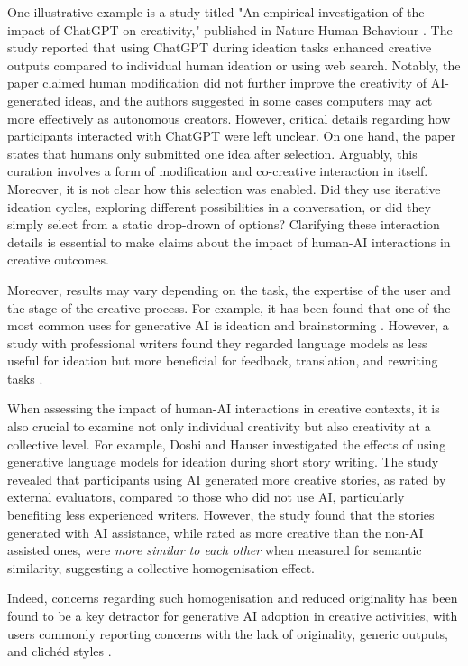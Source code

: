 One illustrative example is a study titled "An empirical investigation of the impact of ChatGPT on creativity," published in Nature Human Behaviour \cite{Lee2024-vz}. The study reported that using ChatGPT during ideation tasks enhanced creative outputs compared to individual human ideation or using web search. Notably, the paper claimed human modification did not further improve the creativity of AI-generated ideas, and the authors suggested in some cases computers may act more effectively as autonomous creators. However, critical details regarding how participants interacted with ChatGPT were left unclear. On one hand, the paper states that humans only submitted one idea after selection. Arguably, this curation involves a form of modification and co-creative interaction in itself. Moreover, it is not clear how this selection was enabled. Did they use iterative ideation cycles, exploring different possibilities in a conversation, or did they simply select from a static drop-drown of options? Clarifying these interaction details is essential to make claims about the impact of human-AI interactions in creative outcomes.

Moreover, results may vary depending on the task, the expertise of the user and the stage of the creative process. For example, it has been found that one of the most common uses for generative AI is ideation and brainstorming \cite{Zao-Sanders2024-qo}. However, a study with professional writers found they regarded language models as less useful for ideation but more beneficial for feedback, translation, and rewriting tasks \cite{Chakrabarty2024-ov}.

When assessing the impact of human-AI interactions in creative contexts, it is also crucial to examine not only individual creativity but also creativity at a collective level. For example, Doshi and Hauser \cite{Doshi2023-dv} investigated the effects of using generative language models for ideation during short story writing. The study revealed that participants using AI generated more creative stories, as rated by external evaluators, compared to those who did not use AI, particularly benefiting less experienced writers. However, the study found that the stories generated with AI assistance, while rated as more creative than the non-AI assisted ones, were \textit{more similar to each other} when measured for semantic similarity, suggesting a collective homogenisation effect.

Indeed, concerns regarding such homogenisation and reduced originality has been found to be a key detractor for generative AI adoption in creative activities, with users commonly reporting concerns with the lack of originality, generic outputs, and clichéd styles \cite{Chakrabarty2024-ov, Chang2023-tv, Clark1998-yi, Ippolito2022-mf, Li2024-yh}.

